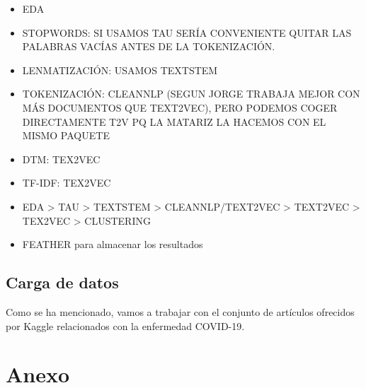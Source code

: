 \documentclass[10pt, a4paper]{article}
\begin{document}
\begin{itemize}
  \item EDA
  
  \item STOPWORDS: SI USAMOS TAU SERÍA CONVENIENTE QUITAR LAS PALABRAS VACÍAS ANTES DE LA TOKENIZACIÓN. 

  \item LENMATIZACIÓN: USAMOS TEXTSTEM

  \item TOKENIZACIÓN: CLEANNLP (SEGUN JORGE TRABAJA MEJOR CON MÁS DOCUMENTOS QUE TEXT2VEC), PERO PODEMOS COGER DIRECTAMENTE T2V PQ LA MATARIZ LA HACEMOS CON EL MISMO PAQUETE

  \item DTM: TEX2VEC

  \item TF-IDF: TEX2VEC
  
  \item EDA > TAU > TEXTSTEM > CLEANNLP/TEXT2VEC > TEXT2VEC > TEX2VEC > CLUSTERING

  \item FEATHER para almacenar los resultados

\end{itemize}


\subsection{Carga de datos}

Como se ha mencionado, vamos a trabajar con el conjunto de artículos ofrecidos por Kaggle relacionados con la enfermedad COVID-19. 




\clearpage

\section{Anexo}

\renewcommand{\listalgorithmcfname}{\subsection{\textbf{Algoritmos}}}
\listofalgorithms
\end{document}
